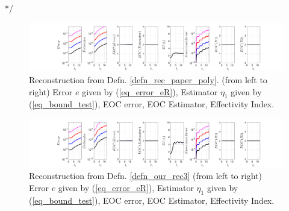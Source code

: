 \documentclass[12pt,a4paper]{article}
\numberwithin{equation}{section}
\theoremstyle{definition}
\begin{document}
*/
\begin{figure}[H]
	\hspace{-3cm}
	\includegraphics[scale=0.55]{fig_LeapFrogplots_1x5_sin_IC_harmonic_u3_v7_paperrec_poly_our_res}	
		\caption{Reconstruction from Defn. \ref{defn_rec_paper_poly}. (from left to right) Error $e$ given by (\ref{eq_error_eR}), Estimator $\eta_1$ given by (\ref{eq_bound_test}), EOC error, EOC Estimator, Effectivity Index.}
	\label{fig_all_in_one_paperrec_polynomial_u03_v07}
\end{figure}

\begin{figure}[H]
	\hspace{-3cm}
	\includegraphics[scale=0.55]{fig_LeapFrogplots_1x5_sin_IC_harmonic_u3_v7_paperrec_poly_tristan}	
	\caption{Reconstruction from Defn. \ref{defn_our_rec3} (from left to right) Error $e$ given by (\ref{eq_error_eR}), Estimator $\eta_1$ given by (\ref{eq_bound_test}), EOC error, EOC Estimator, Effectivity Index.}
	\label{fig_all_in_one_paperrec_poly_tristan_u3_v7}
\end{figure}
\end{document}
